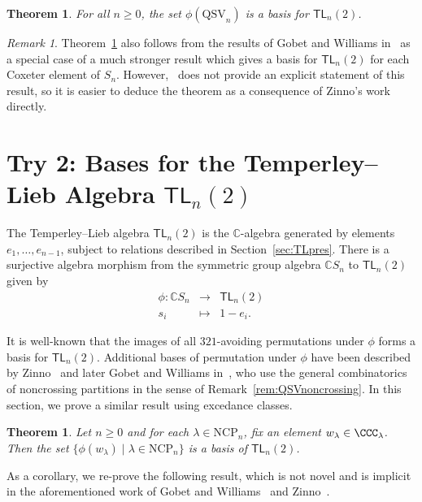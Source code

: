 \documentclass[12pt]{article}
\newtheorem{thm}[equation]{Theorem}
\theoremstyle{definition}
\theoremstyle{remark}
\newtheorem{rem}[equation]{Remark}
\numberwithin{equation}{section}
\newcommand{\CC}{\mathbb{C}}
\renewcommand{\to}{\longrightarrow}
\renewcommand{\mapsto}{\longmapsto}
\newcommand{\TL}{\mathsf{TL}}
\newcommand{\QSV}{\mathrm{QSV}}
\newcommand{\NCP}{\mathrm{NCP}}
\begin{document}
\begin{thm}
\label{thm:TLbasis}
For all $n \ge 0$, the set $\phi(\QSV_{n})$ is a basis for $\TL_{n}(2)$.
\end{thm}

\begin{rem}
Theorem~\ref{thm:TLbasis} also follows from the results of Gobet and Williams in~\cite{GobetWilliams} as a special case of a much stronger result which gives a basis for $\TL_{n}(2)$ for each Coxeter element of $S_{n}$.  
However,~\cite{GobetWilliams} does not provide an explicit statement of this result, so it is easier to deduce the theorem as a consequence of Zinno's work directly.
\end{rem}

\section{Try 2: Bases for the Temperley--Lieb Algebra $\TL_{n}(2)$}

The Temperley--Lieb algebra $\TL_{n}(2)$ is the $\CC$-algebra generated by elements $e_{1}, \ldots, e_{n-1}$, subject to relations described in Section~\ref{sec:TLpres}.  There is a surjective algebra morphism from the symmetric group algebra $\CC S_{n}$ to $\TL_{n}(2)$ given by 
\[
\begin{array}{rcl}
\phi: \CC S_{n} & \to & \TL_{n}(2) \\
s_{i} & \mapsto & 1 - e_{i}.
\end{array}
\]

It is well-known that the images of all $321$-avoiding permutations under $\phi$ forms a basis for $\TL_{n}(2)$.  
Additional bases of permutation under $\phi$ have been described by Zinno~\cite{Zinno} and later Gobet and Williams in~\cite{GobetWilliams}, who use the general combinatorics of noncrossing partitions in the sense of  Remark~\ref{rem:QSVnoncrossing}.
In this section, we prove a similar result using excedance classes.

\begin{thm}
\label{thm:TLbasis}
Let $n \ge 0$ and for each $\lambda \in \NCP_{n}$, fix an element $w_{\lambda} \in \CCC_{\lambda}$.  Then the set 
$\{\phi(w_{\lambda}) \;|\; \lambda \in \NCP_{n}\}$ is a basis of $\TL_{n}(2)$.
\end{thm}

As a corollary, we re-prove the following result, which is not novel and is implicit in the aforementioned work of Gobet and Williams~\cite{GobetWilliams} and Zinno~\cite{Zinno}.
\end{document}
